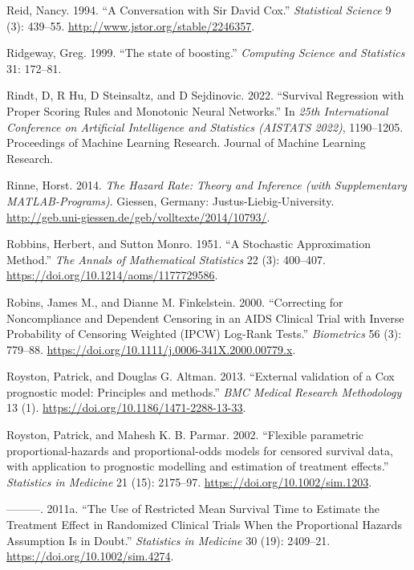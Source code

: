 \documentclass[
  letterpaper,
  krantz2]{style/krantz}
\newlength{\cslhangindent}
\newenvironment{CSLReferences}[2] %
 {\begin{list}{}{%
  \setlength{\itemindent}{0pt}
  \setlength{\leftmargin}{0pt}
  \setlength{\parsep}{0pt}
  \ifodd #1
   \setlength{\leftmargin}{\cslhangindent}
   \setlength{\itemindent}{-1\cslhangindent}
  \fi
  \setlength{\itemsep}{#2\baselineskip}}}
 {\end{list}}
\begin{document}
\begin{CSLReferences}{1}{0}
Reid, Nancy. 1994. {``A Conversation with Sir David Cox.''}
\emph{Statistical Science} 9 (3): 439--55.
\url{http://www.jstor.org/stable/2246357}.

Ridgeway, Greg. 1999. {``{The state of boosting}.''} \emph{Computing
Science and Statistics} 31: 172--81.

Rindt, D, R Hu, D Steinsaltz, and D Sejdinovic. 2022. {``Survival
Regression with Proper Scoring Rules and Monotonic Neural Networks.''}
In \emph{25th International Conference on Artificial Intelligence and
Statistics (AISTATS 2022)}, 1190--1205. Proceedings of Machine Learning
Research. Journal of Machine Learning Research.

Rinne, Horst. 2014. \emph{The Hazard Rate: Theory and Inference (with
Supplementary MATLAB-Programs)}. Giessen, Germany:
Justus-Liebig-University.
\url{http://geb.uni-giessen.de/geb/volltexte/2014/10793/}.

Robbins, Herbert, and Sutton Monro. 1951. {``{A Stochastic Approximation
Method}.''} \emph{The Annals of Mathematical Statistics} 22 (3):
400--407. \url{https://doi.org/10.1214/aoms/1177729586}.

Robins, James M., and Dianne M. Finkelstein. 2000. {``Correcting for
Noncompliance and Dependent Censoring in an {AIDS} Clinical Trial with
Inverse Probability of Censoring Weighted ({IPCW}) Log-Rank Tests.''}
\emph{Biometrics} 56 (3): 779--88.
\url{https://doi.org/10.1111/j.0006-341X.2000.00779.x}.

Royston, Patrick, and Douglas G. Altman. 2013. {``{External validation
of a Cox prognostic model: Principles and methods}.''} \emph{BMC Medical
Research Methodology} 13 (1).
\url{https://doi.org/10.1186/1471-2288-13-33}.

Royston, Patrick, and Mahesh K. B. Parmar. 2002. {``{Flexible parametric
proportional-hazards and proportional-odds models for censored survival
data, with application to prognostic modelling and estimation of
treatment effects}.''} \emph{Statistics in Medicine} 21 (15): 2175--97.
\url{https://doi.org/10.1002/sim.1203}.

---------. 2011a. {``The Use of Restricted Mean Survival Time to
Estimate the Treatment Effect in Randomized Clinical Trials When the
Proportional Hazards Assumption Is in Doubt.''} \emph{Statistics in
Medicine} 30 (19): 2409--21. \url{https://doi.org/10.1002/sim.4274}.


\end{CSLReferences}
\end{document}
